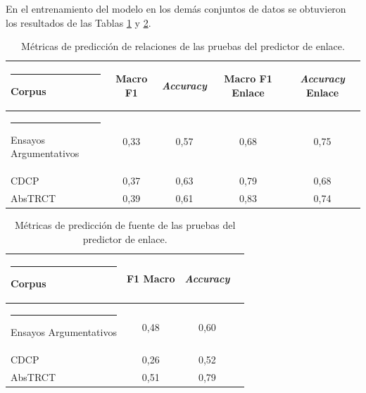 \documentclass[a4paper,11pt,twocolumn,twoside]{article}
\begin{document}
En el entrenamiento del modelo en los demás conjuntos de datos se obtuvieron los resultados de las Tablas 
\ref{table:test_relation_metrics_link_predictor} y \ref{table:test_source_metrics_link_predictor}.

\begin{table}[h]
	\begin{center}
		\begin{tabular}{|l|c|c|c|c|} 
			\hline\rule{-2pt}{15pt}
			{\bf Corpus}                 & {\bf Macro F1} & {\bf \textit{Accuracy}} & {\bf Macro F1 Enlace} & {\bf \textit{Accuracy} Enlace} \\
			\hline\rule{-4pt}{10pt}
			Ensayos Argumentativos & 0,33     & 0,57            & 0,68            & 0,75                   \\ 
			CDCP                   & 0,37     & 0,63            & 0,79            & 0,68                   \\ 
			AbsTRCT                & 0,39     & 0,61            & 0,83            & 0,74                   \\ 
			\hline
		\end{tabular}
	\end{center}
	\caption{\label{table:test_relation_metrics_link_predictor}Métricas de predicción de relaciones de las pruebas del predictor de enlace.}
\end{table}

\begin{table}[h]
	\begin{center}
		\begin{tabular}{|l|c|c|c|} 
			\hline\rule{-2pt}{15pt}
			{\bf Corpus}                 & {\bf F1 Macro} & {\bf \textit{Accuracy}} \\ 
			\hline\rule{-4pt}{10pt}
			Ensayos Argumentativos & 0,48     & 0,60            \\ 
			CDCP                   & 0,26     & 0,52            \\ 
			AbsTRCT                & 0,51     & 0,79            \\ 
			\hline
		\end{tabular}
	\end{center}
	\caption{\label{table:test_source_metrics_link_predictor}Métricas de predicción de fuente de las pruebas del predictor de enlace.}
\end{table}
\end{document}
